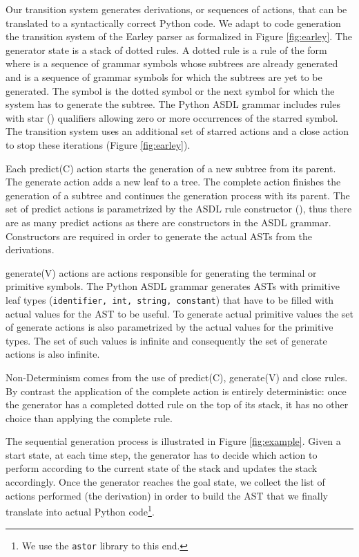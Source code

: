 \documentclass[11pt]{article}
\begin{document}
Our transition system generates derivations, or sequences of actions, that can be translated to a syntactically correct Python code. We adapt to code generation the transition system of the Earley parser \cite{earley:1970} as formalized in Figure \ref{fig:earley}. The generator state is a stack of dotted rules. A dotted rule is a rule of the form  where  is a sequence of grammar symbols whose subtrees are already generated and  is a sequence of grammar symbols for which the subtrees are yet to be generated. The  symbol is the dotted symbol or the next symbol for which the system has to generate the subtree. The Python ASDL grammar includes rules with star () qualifiers allowing zero or more occurrences of the starred symbol. The transition system uses an additional set of starred actions and a {\sc close} action to stop these iterations (Figure \ref{fig:earley}).  

Each {\sc predict}(C) action starts the generation of a new subtree from its parent. The {\sc generate} action adds a new leaf to a tree. The {\sc complete} action finishes the generation of a subtree and continues the generation process with its parent. The set of {\sc predict} actions is parametrized by the ASDL rule constructor (), thus there are as many predict actions as there are constructors in the ASDL grammar. Constructors are required in order to generate the actual ASTs from the derivations.

{\sc generate}(V) actions are actions responsible for generating the terminal or primitive symbols. The Python ASDL grammar generates ASTs with primitive leaf types ({\tt identifier, int, string, constant}) that have to be filled with actual values for the AST to be useful. 
To generate actual primitive values the set of generate actions is also parametrized by the actual values  for the primitive types. The set of such values is infinite and consequently the set of generate actions is also infinite. 

Non-Determinism comes from the use of {\sc predict}(C), {\sc generate}(V) and {\sc close} rules. By contrast the application of the {\sc complete} action is entirely deterministic: once the generator has a completed dotted rule on the top of its stack, it has no other choice than applying the complete rule.


The sequential generation process is illustrated in Figure \ref{fig:example}. Given a start state, at each time step, the generator has to decide which action to perform according to the current state of the stack and updates the stack accordingly. Once the generator reaches the goal state, we collect the list of actions performed (the derivation) in order to build the AST that we finally translate into actual Python code\footnote{We use the \texttt{astor} library to this end.}.
 
\end{document}
